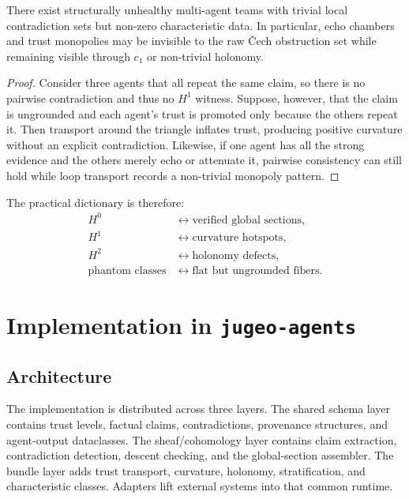 \documentclass[11pt]{article}
\newcommand{\Chern}{c_1}
\newcommand{\JuGeoAgents}{\texttt{jugeo-agents}}
\begin{document}
\begin{proposition}
There exist structurally unhealthy multi-agent teams with trivial local
contradiction sets but non-zero characteristic data.  In particular, echo
chambers and trust monopolies may be invisible to the raw \v{C}ech obstruction
set while remaining visible through $\Chern$ or non-trivial holonomy.
\end{proposition}

\begin{proof}
Consider three agents that all repeat the same claim, so there is no pairwise
contradiction and thus no $H^1$ witness.  Suppose, however, that the claim is
ungrounded and each agent's trust is promoted only because the others repeat it.
Then transport around the triangle inflates trust, producing positive curvature
without an explicit contradiction.  Likewise, if one agent has all the strong
evidence and the others merely echo or attenuate it, pairwise consistency can
still hold while loop transport records a non-trivial monopoly pattern.
\end{proof}

The practical dictionary is therefore:
\[
\begin{aligned}
H^0 &\leftrightarrow \text{verified global sections},\\
H^1 &\leftrightarrow \text{curvature hotspots},\\
H^2 &\leftrightarrow \text{holonomy defects},\\
\text{phantom classes} &\leftrightarrow \text{flat but ungrounded fibers}.
\end{aligned}
\]

\section{Implementation in \JuGeoAgents{}}\label{sec:implementation}

\subsection{Architecture}

The implementation is distributed across three layers.  The shared schema layer
contains trust levels, factual claims, contradictions, provenance structures,
and agent-output dataclasses.  The sheaf/cohomology layer contains claim
extraction, contradiction detection, descent checking, and the global-section
assembler.  The bundle layer adds trust transport, curvature, holonomy,
stratification, and characteristic classes.  Adapters lift external systems into
that common runtime.
\end{document}
